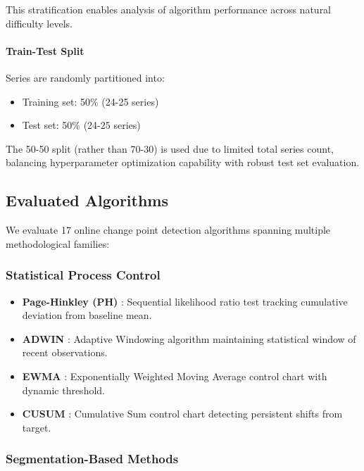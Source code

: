 This stratification enables analysis of algorithm performance across natural difficulty levels.

\paragraph{Train-Test Split}

Series are randomly partitioned into:
\begin{itemize}
    \item Training set: 50\% (24-25 series)
    \item Test set: 50\% (24-25 series)
\end{itemize}

The 50-50 split (rather than 70-30) is used due to limited total series count, balancing hyperparameter optimization capability with robust test set evaluation.

\subsection{Evaluated Algorithms}
\label{sec:algorithms}

We evaluate 17 online change point detection algorithms spanning multiple methodological families:

\subsubsection{Statistical Process Control}

\begin{itemize}
    \item \textbf{Page-Hinkley (PH)} \cite{page1954continuous}: Sequential likelihood ratio test tracking cumulative deviation from baseline mean.
    
    \item \textbf{ADWIN} \cite{bifet2007learning}: Adaptive Windowing algorithm maintaining statistical window of recent observations.
    
    \item \textbf{EWMA} \cite{roberts1959control}: Exponentially Weighted Moving Average control chart with dynamic threshold.
    
    \item \textbf{CUSUM} \cite{page1954continuous}: Cumulative Sum control chart detecting persistent shifts from target.
\end{itemize}

\subsubsection{Segmentation-Based Methods}

